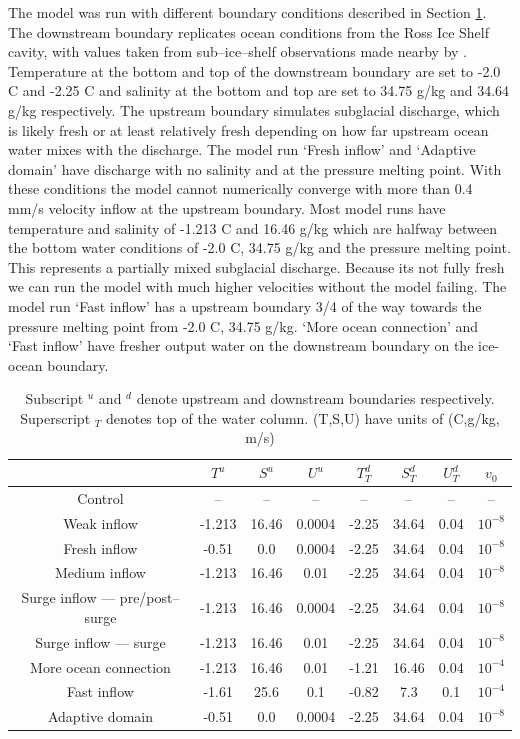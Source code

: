 The model was run with different boundary conditions described in Section \ref{tab:model_runs}. The downstream boundary replicates ocean conditions from the Ross Ice Shelf cavity, with values taken from sub--ice--shelf observations made nearby by \citep{robinson2020ice}. 
Temperature at the bottom and top of the downstream boundary are set to -2.0 \textdegree C and -2.25 \textdegree C and salinity at the bottom and top are set to 34.75 g/kg and 34.64 g/kg respectively. 
The upstream boundary simulates subglacial discharge, which is likely fresh or at least relatively fresh depending on how far upstream ocean water mixes with the discharge. The model run `Fresh inflow' and `Adaptive domain' have discharge with no salinity and at the pressure melting point. With these conditions the model cannot numerically converge with more than 0.4 mm/s velocity inflow at the upstream boundary. Most model runs have temperature and salinity of -1.213 \textdegree C and 16.46 g/kg which are halfway between the bottom water conditions of -2.0 \textdegree C, 34.75 g/kg and the pressure melting point. This represents a partially mixed subglacial discharge. Because its not fully fresh we can run the model with much higher velocities without the model failing. The model run `Fast inflow' has a upstream boundary 3/4 of the way towards the pressure melting point from -2.0 \textdegree C, 34.75 g/kg. `More ocean connection' and `Fast inflow' have fresher output water on the downstream boundary on the ice-ocean boundary. 
\begin{table}[!ht]
\begin{tabular}{|c|c|c|c|c|c|c|c|}
    \hline
    & $T^{u}$ & $S^{u} $ & $U^{u}$& $T^d_T$ & $S^d_T$ & $U^d_T$ & $v_0$ \\
     \hline
    Control & -- & -- & --& -- &--  &--  &--  \\
    Weak inflow & -1.213 & 16.46  &0.0004 &  -2.25 & 34.64 & 0.04 & $10^{-8}$  \\
    Fresh inflow & -0.51 & 0.0 &0.0004 &  -2.25 & 34.64 & 0.04 & $10^{-8}$  \\
    Medium inflow & -1.213 & 16.46 & 0.01 &  -2.25 & 34.64 & 0.04  & $10^{-8}$ \\
    Surge inflow --- pre/post--surge  & -1.213 & 16.46  &0.0004 &  -2.25 & 34.64 & 0.04 & $10^{-8}$ \\
    Surge inflow --- surge & -1.213 & 16.46 & 0.01 &  -2.25 & 34.64 & 0.04  & $10^{-8}$ \\
    More ocean connection & -1.213 & 16.46 & 0.01 &  -1.21 & 16.46 & 0.04& $10^{-4}$  \\
    Fast inflow & -1.61 & 25.6 & 0.1 & -0.82 & 7.3  & 0.1 & $10^{-4}$ \\
    \hline
    Adaptive domain  & -0.51 & 0.0 &0.0004 &  -2.25 & 34.64 & 0.04 & $10^{-8}$ \\
    \hline
\end{tabular}
\caption[Model run parameters]{\label{tab:model_runs} Subscript $^u$ and $^d$ denote upstream and downstream boundaries respectively. Superscript $_T$ denotes top of the water column. (T,S,U) have units of (\textdegree C,g/kg, m/s)  }
\end{table}

